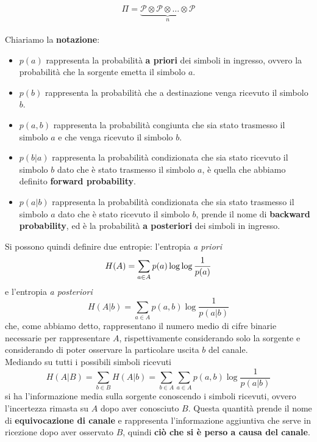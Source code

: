 \begin{equation}
    \Pi = \underbrace{\mathcal{P} \otimes \mathcal{P} \otimes \dots \otimes \mathcal{P}}_n
\end{equation}
\\
Chiariamo la \textbf{notazione}:
\begin{itemize}
    \item $p(a)$ rappresenta la probabilit\`a \textbf{a priori} dei simboli in ingresso, ovvero la probabilit\`a che la sorgente emetta il simbolo $a$.
    \item $p(b)$ rappresenta la probabilità che a destinazione venga ricevuto il simbolo $b$.
    \item $p(a,b)$ rappresenta la probabilità congiunta che sia stato trasmesso il simbolo $a$ e che venga ricevuto il simbolo $b$.
    \item $p(b|a)$ rappresenta la probabilità condizionata che sia stato ricevuto il simbolo $b$ dato che è stato trasmesso il simbolo $a$, \`e quella che abbiamo definito \textbf{forward probability}.
    \item $p(a|b)$ rappresenta la probabilità condizionata che sia stato trasmesso il simbolo $a$ dato che è stato ricevuto il simbolo $b$, prende il nome di \textbf{backward probability}, ed \`e la probabilit\`a \textbf{a posteriori} dei simboli in ingresso.
\end{itemize}
Si possono quindi definire due entropie: l'entropia \textit{a priori}
\begin{equation}
    H(A) = \sum_{a \in A} p(a) \log \log \frac{1}{p({a})}
\end{equation}
e l'entropia \textit{a posteriori}
\begin{equation}
    H(A|b) = \sum_{a \in A} p(a,b) \log \frac{1}{p(a|b)}
\end{equation}
che, come abbiamo detto, rappresentano il numero medio di cifre binarie necessarie per rappresentare $A$, rispettivamente considerando solo la sorgente e considerando di poter osservare la particolare uscita $b$ del canale. \\
Mediando su tutti i possibili simboli ricevuti
\begin{equation}
    H(A|B) = \sum_{b \in B} H(A|b) = \sum_{b \in A} \sum_{a \in A} p(a,b) \log \frac{1}{p(a|b)}
\end{equation}
si ha l’informazione media sulla sorgente conoscendo
i simboli ricevuti, ovvero l’incertezza rimasta su $A$ dopo aver conosciuto $B$. Questa quantit\`a prende il nome di \textbf{equivocazione di canale} e rappresenta l’informazione aggiuntiva che serve in ricezione dopo aver osservato $B$, quindi \textbf{ci\`o che si \`e perso a causa del canale}.\\
